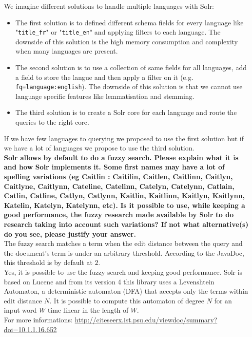 \documentclass[a4paper]{article}
\begin{document}
We imagine different solutions to handle multiple languages with Solr:
\begin{itemize}  
	\item The first solution is to defined different schema fields for every language like "\texttt{title\_fr}" or "\texttt{title\_en}" and applying filters to each language. The downside of this solution is the high memory consumption and complexity when many languages are present.
	\item The second solution is to use a collection of same fields for all languages, add a field to store the langue and then apply a filter on it (e.g. \texttt{fq=language:english}). The downside of this solution is that we cannot use language specific features like lemmatisation and stemming.
	\item The third solution is to create a Solr core for each language and route the queries to the right core.
\end{itemize}
If we have few languages to querying we proposed to use the first solution but if we have a lot of languages we propose to use the third solution. \\

\textbf{Solr allows by default to do a fuzzy search. Please explain what it is and how Solr implements it. Some first names may have a lot of spelling variations (eg Caitlin : Caitilin, Caitlen, Caitlinn, Caitlyn, Caitlyne, Caitlynn, Cateline, Catelinn, Catelyn, Catelynn, Catlain, Catlin, Catline, Catlyn, Catlynn, Kaitlin, Kaitlinn, Kaitlyn, Kaitlynn, Katelin, Katelyn, Katelynn, etc). Is it possible to use, while keeping a good performance, the fuzzy research made available by Solr to do research taking into account such variations? If not what alternative(s) do you see, please justify your answer.} \\

The fuzzy search matches a term when the edit distance between the query and the document's term is under an arbitrary threshold. According to the JavaDoc, this threshold is by default at $2$. \\

Yes, it is possible to use the fuzzy search and keeping good performance. Solr is based on Lucene and from its version 4 this library uses a Levenshtein Automaton, a deterministic automaton (DFA) that accepts only the terms within edit distance $N$. It is possible to compute this automaton of degree $N$ for an input word $W$ time linear in the length of $W$. \\

For more informations: \url{http://citeseerx.ist.psu.edu/viewdoc/summary?doi=10.1.1.16.652} 
\end{document}
